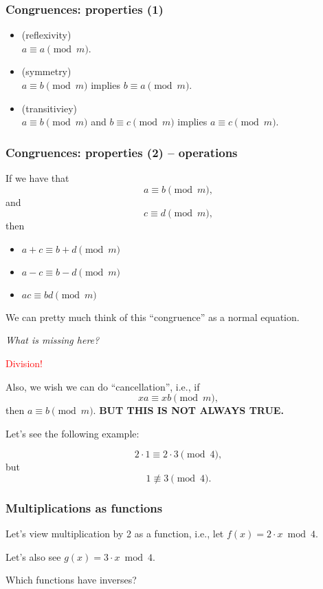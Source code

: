 \begin{frame}
  \frametitle{Congruences: properties (1)}

  \begin{itemize}
  \item (reflexivity) \\
    $a\equiv a \pmod m$.
  \item (symmetry) \\
    $a\equiv b \pmod m$ implies $b\equiv a \pmod m$.
  \item (transitiviey) \\
    $a\equiv b \pmod m$ and $b \equiv c \pmod m$ implies $a \equiv c\pmod m$.
  \end{itemize}
\end{frame}
\begin{frame}
  \frametitle{Congruences: properties (2) -- operations}

  If we have that
  \[
  a \equiv b \pmod m,
  \]
  and
  \[
  c \equiv d \pmod m,
  \]
  then
  
  \begin{itemize}
  \item $a+c \equiv b+d \pmod m$
  \item $a-c \equiv b-d \pmod m$
  \item $ac \equiv bd \pmod m$
  \end{itemize}

  \pause
  \vspace{0.2in}

  We can pretty much think of this ``congruence'' as a normal
  equation.

  \vspace{0.1in}
  \pause
  {\em What is missing here?}
  \pause

  \textcolor{red}{Division!}

\end{frame}

\begin{frame}
  Also, we wish we can do ``cancellation'', i.e., if
  \[
  xa \equiv xb \pmod m,
  \]
  then $a \equiv b \pmod m$.  {\bf BUT THIS IS NOT ALWAYS TRUE.}
  
  \pause

  Let's see the following example:

  \[
  2\cdot 1 \equiv 2\cdot 3 \pmod 4,
  \]
  but
  \[
  1 \not\equiv 3\pmod 4.
  \]
\end{frame}

\begin{frame}
  \frametitle{Multiplications as functions}

  Let's view multiplication by 2 as a function, i.e., let $f(x)=2\cdot
  x\bmod 4$.

  \vspace{1in}

  \pause
  Let's also see $g(x) = 3\cdot x \bmod 4$.

  \vspace{1in}

  \pause
  Which functions have inverses?
\end{frame}

